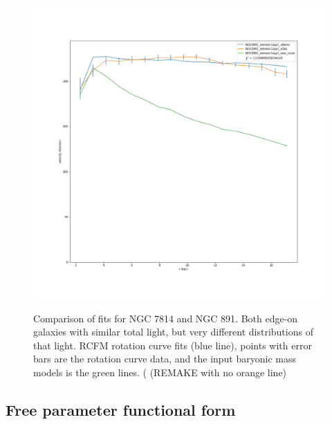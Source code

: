 \documentclass[reprint,%
 amsmath,amssymb,
 aps,
]{revtex4-1}
\begin{document}
\begin{figure}
\begin{minipage}{.5\textwidth}
  \includegraphics[width=.95\linewidth]{figures/NGC0891_rotmod-Copy1_XueSofue.png}
  \label{fig:test1}
\end{minipage}
 \caption{Comparison of fits for NGC 7814 and NGC 891. Both edge-on galaxies with similar total light, but very different distributions of that light.     RCFM rotation curve fits (blue line), points with error bars are the rotation curve data, and the input baryonic mass models is  the green lines. {\color{blue}( (REMAKE with no orange line) } }\label{fitCompare7814_891}
\end{figure}
 
 
 
 
  

\subsection{Free parameter functional form }\label{FreeCorrel}
\end{document}
